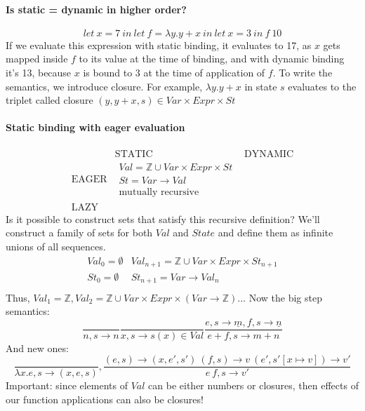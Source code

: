 \documentclass{article}
\begin{document}
\paragraph{Is static = dynamic in higher order?}
$$let\ x=7\ in \ let \ f=\lambda y.y+x\ in\ let\ x=3\ in \ f\ 10$$
If we evaluate this expression with static binding, it evaluates to 17, as $ x $ gets mapped inside $ f $ to its value at the time of binding, and with dynamic binding it's 13, because $ x $ is bound to 3 at the time of application of $ f $.
To write the semantics, we introduce closure. For example, $ \lambda y.y+x $ in state $ s $ evaluates to the triplet called closure $ (y, y+x, s) \in Var\times Expr\times St$
\paragraph{Static binding with eager evaluation}
$$
\begin{matrix}
& \text{STATIC}& \text{DYNAMIC}\\
\text{EAGER}&
	\begin{matrix}
	Val=\mathbb{Z}\cup Var\times Expr\times St\\
	St=Var\rightarrow Val\\
	\text{mutually recursive}
	\end{matrix}&\\
\text{LAZY}&&
\end{matrix}
$$
Is it possible to construct sets that satisfy this recursive definition? We'll construct a family of sets for both $ Val $ and $ State $ and define them as infinite unions of all sequences.
$$
\begin{matrix}
Val_0=\emptyset & Val_{n+1}=\mathbb{Z}\cup Var\times Expr\times St_{n+1}\\
St_0=\emptyset  & St_{n+1}=Var\rightarrow Val_n\\
\end{matrix}
$$
Thus, $ Val_1=\mathbb{Z}, Val_2=\mathbb{Z}\cup Var\times Expr\times(Var\rightarrow \mathbb{Z})\ldots $
Now the big step semantics:
$$\frac{}{n,s\rightarrow n}\frac{}{x,s\rightarrow s(x)\in Val}
\frac{e,s\rightarrow\underline{m}, f,s\rightarrow \underline{n}}{e+f,s\rightarrow m+n}$$
And new ones:
$$\frac{}{\lambda x.e,s\rightarrow (x, e,s)},
\frac{(e, s)\rightarrow (x, e', s')\ (f, s) \rightarrow v\ (e', s'[x\mapsto v])\rightarrow v'}{e\ f,s\rightarrow v'}$$
Important: since elements of $Val$ can be either numbers or closures, then effects of our function applications can also be closures!
\end{document}
